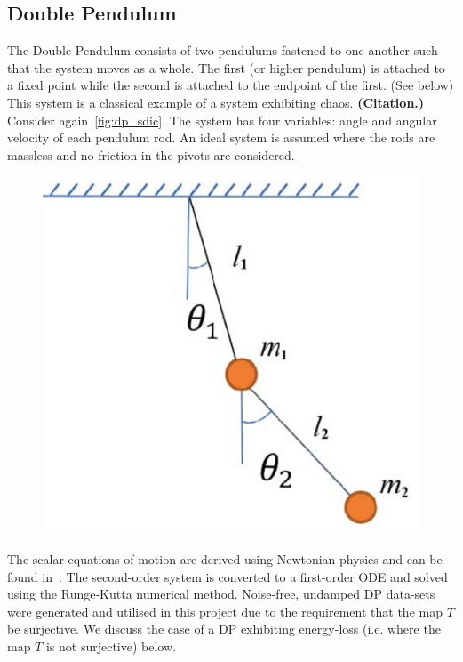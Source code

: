 \documentclass[a4paper,12pt,twoside]{report}
\begin{document}
\subsection{Double Pendulum}

The Double Pendulum consists of two pendulums fastened to one another such that the system moves as a whole. The first (or higher pendulum) is attached to a fixed point while the second is attached to the endpoint of the first. (See below)
This system is a classical example of a system exhibiting chaos. \textbf{(Citation.)} Consider again~\ref{fig:dp_sdic}.
The system has four variables: angle and angular velocity of each pendulum rod. An ideal system is assumed where the rods are massless and no friction in the pivots are considered.

\begin{figure}[ht]
  \includegraphics[scale=0.35]{_dp_setup.eps}
  \centering
  \label{fig:dp_setup}
\end{figure}

The scalar equations of motion are derived using Newtonian physics and can be found in~\cite{DPFormulas}. The second-order system is converted to a first-order ODE and solved using the Runge-Kutta numerical method.  Noise-free, undamped DP data-sets were generated and utilised in this project due to the requirement that the map $T$ be surjective. We discuss the case of a DP exhibiting energy-loss (i.e. where the map $T$ is not surjective) below.
\end{document}
